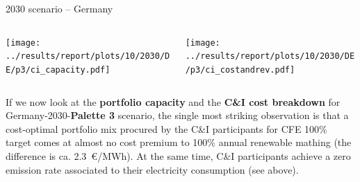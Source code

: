 \begin{frame}{2030 scenario -- Germany}

  {\footnotesize

  \begin{columns}
  \begin{column}{7cm}
  \centering
  \texttt{[image: ../results/report/plots/10/2030/DE/p3/ci\_capacity.pdf]}
  \end{column}

  \begin{column}{8cm}
  \centering
  \texttt{[image: ../results/report/plots/10/2030/DE/p3/ci\_costandrev.pdf]}
  \end{column}

  \end{columns}

  \begin{columns}
  \begin{column}{15cm}

    If we now look at the {\bf portfolio capacity} and the {\bf C\&I cost breakdown} 
    for Germany-2030-{\bf Palette 3} scenario, the single most striking observation is that 
    a cost-optimal portfolio mix procured by the C\&I participants for CFE 100\% target comes 
    at \alert{almost no cost premium} to 100\% annual renewable mathing (the difference is ca. 2.3~\euro/MWh).
    At the same time, C\&I participants achieve a \alert{zero emission rate} associated to their 
    electricity consumption (see above).

  \end{column}
  \end{columns}
  }

\end{frame}


